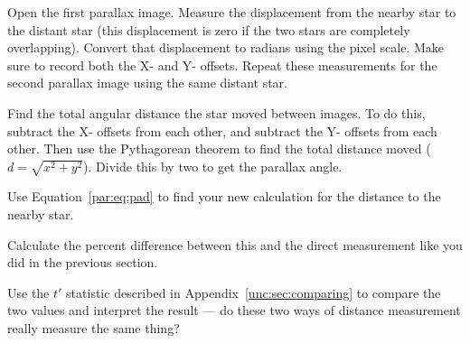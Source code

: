\begin{steps}
	\item Open the first parallax image. Measure the displacement from the nearby star to the distant star (this displacement is zero if the two stars are completely overlapping). Convert that displacement to radians using the pixel scale. Make sure to record both the X- and Y- offsets. Repeat these measurements for the second parallax image using the same distant star.

	\item Find the total angular distance the star moved between images. To do this, subtract the X- offsets from each other, and subtract the Y- offsets from each other. Then use the Pythagorean theorem to find the total distance moved ($d = \sqrt{x^2 + y^2}$). Divide this by two to get the parallax angle.
	
	\item Use Equation\ \ref{par:eq:pad} to find your new calculation for the distance to the nearby star.
	
	\item Calculate the percent difference between this and the direct measurement like you did in the previous section.
	
	\item Use the $t'$ statistic described in Appendix\ \ref{unc:sec:comparing} to compare the two values and interpret the result --- do these two ways of distance measurement really measure the same thing?
\end{steps}


%



